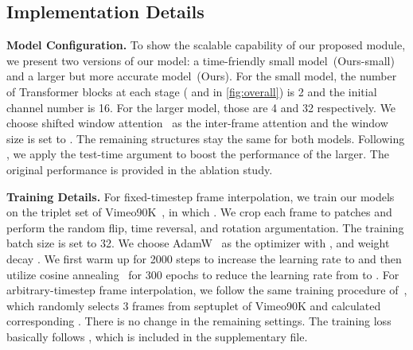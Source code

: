 \documentclass[10pt,twocolumn,letterpaper]{article}
\begin{document}
    \subsection{Implementation Details}
    \label{exp:td}
    \noindent
    \textbf{Model Configuration.} To show the scalable capability of our proposed module, we present two versions of our model: a time-friendly small model~(Ours-small) and a larger but more accurate model~(Ours). For the small model, the number of Transformer blocks at each stage ( and  in \cref{fig:overall}) is 2 and the initial channel number  is 16. For the larger model, those are 4 and 32 respectively. We choose shifted window attention~\cite{liu2021swin} as the inter-frame attention and the window size is set to . The remaining structures stay the same for both models. Following \cite{huang2020rife}, we apply the test-time argument to boost the performance of the larger. The original performance is provided in the ablation study.

    \noindent
    \textbf{Training Details.} 
    For fixed-timestep frame interpolation, we train our models on the triplet set of Vimeo90K~\cite{xue2019video}, in which . We crop each frame to  patches and perform the random flip, time reversal, and rotation argumentation. The training batch size is set to 32. We choose AdamW~\cite{loshchilov2018fixing} as the optimizer with ,  and weight decay . We first warm up for 2000 steps to increase the learning rate to  and then utilize cosine annealing~\cite{loshchilov2016sgdr} for 300 epochs to reduce the learning rate from  to . For arbitrary-timestep frame interpolation, we follow the same training procedure of~\cite{huang2020rife}, which randomly selects 3 frames from septuplet of Vimeo90K and calculated corresponding . There is no change in the remaining settings. The training loss basically follows \cite{niklaus2020softmax,huang2020rife}, which is included in the supplementary file. 
\end{document}
